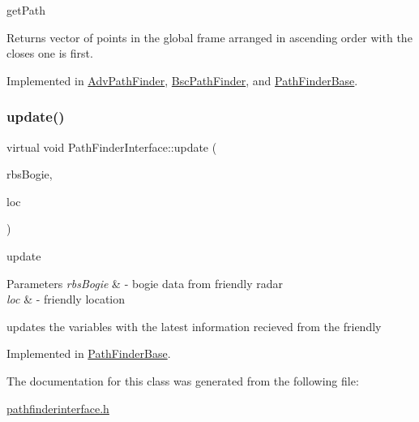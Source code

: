 get\+Path 

\begin{DoxyReturn}{Returns}
vector of points in the global frame arranged in ascending order with the closes one is first. 
\end{DoxyReturn}


Implemented in \hyperlink{classAdvPathFinder_a4abff5170d4b63a4fa98262d90e14f32}{Adv\+Path\+Finder}, \hyperlink{classBscPathFinder_abbcde7b0e482fdc4f3fb1428c88bccb5}{Bsc\+Path\+Finder}, and \hyperlink{classPathFinderBase_aa254c2b8392f028898f691920341caa0}{Path\+Finder\+Base}.

\mbox{\label{classPathFinderInterface_a8a2011052fb64cab85a66a21092416f2}} 
\subsubsection{\texorpdfstring{update()}{update()}}
{\footnotesize\ttfamily virtual void Path\+Finder\+Interface\+::update (\begin{DoxyParamCaption}\item[{std\+::vector$<$ geometry\+\_\+msgs\+::\+Range\+Bearing\+Stamped $>$}]{rbs\+Bogie,  }\item[{geometry\+\_\+msgs\+::\+Pose}]{loc }\end{DoxyParamCaption})\hspace{0.3cm}{\ttfamily [pure virtual]}}



update 


\begin{DoxyParams}{Parameters}
{\em rbs\+Bogie} & -\/ bogie data from friendly radar \\
\hline
{\em loc} & -\/ friendly location\\
\hline
\end{DoxyParams}
updates the variables with the latest information recieved from the friendly 

Implemented in \hyperlink{classPathFinderBase_a7ab8a19a0247b66e5636e29194e5fadd}{Path\+Finder\+Base}.



The documentation for this class was generated from the following file\+:\begin{DoxyCompactItemize}
\item 
\hyperlink{pathfinderinterface_8h}{pathfinderinterface.\+h}\end{DoxyCompactItemize}
